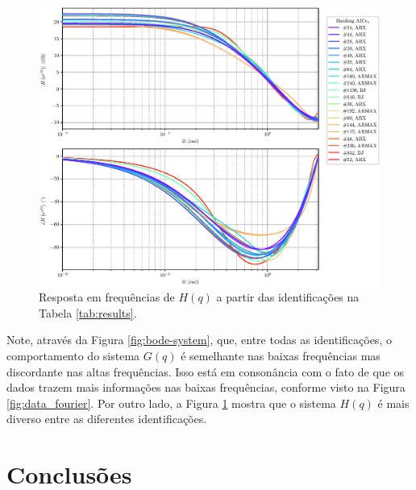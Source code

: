 \documentclass{ppgeesa}
\begin{document}
\begin{figure}[!htbp]
  \centering
  \includegraphics[width=\linewidth]{bode_H_AICCv}
  \caption{Resposta em frequências de $H(q)$ a partir das identificações na Tabela \ref{tab:results}.}
  \label{fig:bode-noise}
\end{figure}

Note, através da Figura \ref{fig:bode-system}, que, entre todas as identificações, o comportamento do sistema $G(q)$ é semelhante nas baixas frequências mas discordante nas altas frequências.
Isso está em consonância com o fato de que os dados trazem mais informações nas baixas frequências, conforme visto na Figura \ref{fig:data_fourier}.
Por outro lado, a Figura \ref{fig:bode-noise} mostra que o sistema $H(q)$ é mais diverso entre as diferentes identificações.

\section{Conclusões}



\end{document}
